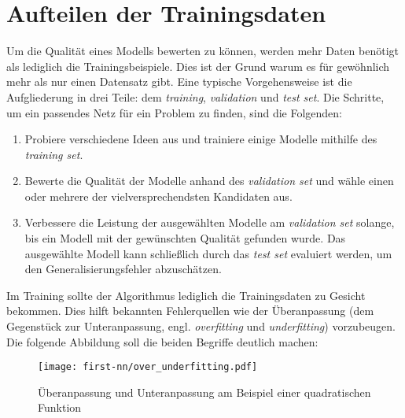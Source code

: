 \section{Aufteilen der Trainingsdaten}
\label{sec:split-train-data}
Um die Qualität eines Modells bewerten zu können, werden
mehr Daten benötigt als lediglich die Trainingsbeispiele.
Dies ist der Grund warum es für gewöhnlich mehr als nur einen
Datensatz gibt. Eine typische Vorgehensweise ist die Aufgliederung
in drei Teile: dem \textit{training}, \textit{validation} und \textit{test set}.
Die Schritte, um ein passendes Netz für ein Problem zu finden, sind die Folgenden:
\begin{enumerate}
  \item Probiere verschiedene Ideen aus und trainiere einige Modelle mithilfe des
        \textit{training set}.
  \item Bewerte die Qualität der Modelle anhand des \textit{validation set} und wähle
        einen oder mehrere der vielversprechendsten Kandidaten aus.
  \item Verbessere die Leistung der ausgewählten Modelle am \textit{validation set}
        solange, bis ein Modell mit der gewünschten Qualität gefunden wurde.
        Das ausgewählte Modell kann schließlich durch das
        \textit{test set} evaluiert werden, um den Generalisierungsfehler abzuschätzen.
\end{enumerate}
Im Training sollte der Algorithmus lediglich die Trainingsdaten
zu Gesicht bekommen. Dies hilft bekannten
Fehlerquellen wie der Überanpassung (dem Gegenstück zur Unteranpassung, engl.
\textit{overfitting} und \textit{underfitting}) vorzubeugen.
Die folgende Abbildung soll die beiden Begriffe deutlich machen:
\begin{figure}[h!]
  \centering
  \texttt{[image: first-nn/over\_underfitting.pdf]}
  \caption{Überanpassung und Unteranpassung am Beispiel einer
  quadratischen Funktion \parencite[131]{book:hands-on-ml}}
\end{figure}

